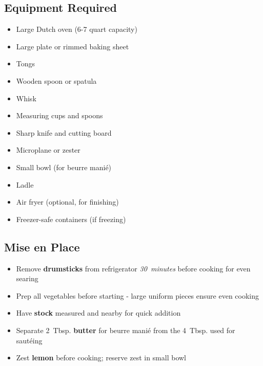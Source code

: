\documentclass[11pt,letterpaper]{article}
\begin{document}
\newpage

{\small
\setlength{\columnsep}{20pt}
\setlength{\multicolsep}{6pt}
\begin{multicols}{2}
\setlength{\parindent}{0pt}
\setlength{\parskip}{4pt}

\section*{Equipment Required}
\begin{itemize}
    \item Large Dutch oven (6-7 quart capacity)
    \item Large plate or rimmed baking sheet
    \item Tongs
    \item Wooden spoon or spatula
    \item Whisk
    \item Measuring cups and spoons
    \item Sharp knife and cutting board
    \item Microplane or zester
    \item Small bowl (for beurre manié)
    \item Ladle
    \item Air fryer (optional, for finishing)
    \item Freezer-safe containers (if freezing)
\end{itemize}

\subsection*{Mise en Place}
\begin{itemize}
    \item Remove \textbf{drumsticks} from refrigerator \textit{30~minutes} before cooking for even searing
    \item Prep all vegetables before starting - large uniform pieces ensure even cooking
    \item Have \textbf{stock} measured and nearby for quick addition
    \item Separate 2~Tbsp. \textbf{butter} for beurre manié from the 4~Tbsp. used for sautéing
    \item Zest \textbf{lemon} before cooking; reserve zest in small bowl
\end{itemize}


\end{multicols}}
\end{document}

